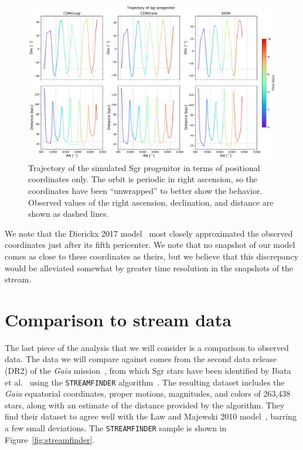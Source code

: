 \begin{figure}
    \centering 
    \includegraphics[width=0.9\linewidth]{figs/equatorial_progenitor_coords_unwrapped.pdf}
    \caption{%
        Trajectory of the simulated Sgr progenitor in terms of positional
        coordinates only. The orbit is periodic in right ascension, so the
        coordinates have been ``unwrapped'' to better show the behavior.
        Observed values of the right ascension, declination, and distance are
        shown as dashed lines.
    }
    \label{fig:eq_prog_unwrapped}
\end{figure}

We note that the Dierickx 2017 model~\cite{dierickx_predicted_2017} most closely
approximated the observed coordinates just after its fifth pericenter. We note
that no snapshot of our model comes as close to these coordinates as theirs, but
we believe that this discrepancy would be alleviated somewhat by greater time
resolution in the snapshots of the stream.



\hypertarget{comparison-to-stream-data}{%
\section{Comparison to stream data}\label{comparison-to-stream-data}}

The last piece of the analysis that we will consider is a comparison to observed
data.  The data we will compare against comes from the second data release
(DR2) of the \textit{Gaia}
mission~\cite{lindegren_gaia_2018,gaia_collaboration_gaia_2018}, from which Sgr
stars have been identified by Ibata et al.~\cite{ibata_panoramic_2020} using the
\verb|STREAMFINDER|
algorithm~\cite{malhan_streamfinder_2018,malhan_ghostly_2018}. The resulting
dataset includes the \textit{Gaia} equatorial coordinates, proper motions,
magnitudes, and colors of 263,438 stars, along with an estimate of the distance
provided by the algorithm. They find their dataset to agree well with the Law
and Majewski 2010 model~\cite{law_sagittarius_2010}, barring a few small
deviations. The \verb|STREAMFINDER| sample is shown in Figure~\ref{fig:streamfinder}.

